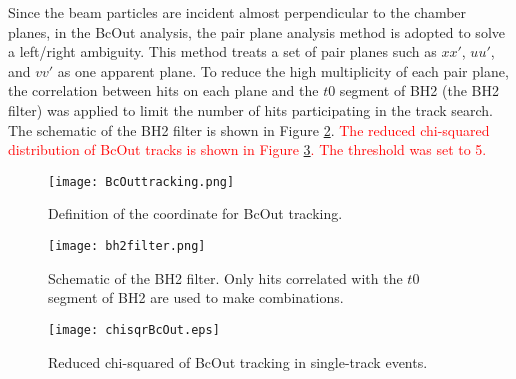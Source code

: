 Since the beam particles are incident almost perpendicular to the chamber planes, in the BcOut analysis, the pair plane analysis method is adopted to solve a left/right ambiguity. This method treats a set of pair planes such as $xx'$, $uu'$, and $vv'$ as one apparent plane. To reduce the high multiplicity of each pair plane, the correlation between hits on each plane and the $t0$ segment of BH2 (the BH2 filter) was applied to limit the number of hits participating in the track search. The schematic of the BH2 filter is shown in Figure \ref{fig-bh2filter}. \textcolor{red}{The reduced chi-squared distribution of BcOut tracks is shown in Figure \ref{fig-chisqrBcOut}. The threshold was set to 5.}

\begin{figure}[!h]
  \begin{center}
    \texttt{[image: BcOuttracking.png]}
    \caption{Definition of the coordinate for BcOut tracking.}
    \label{fig-BcOuttracking}
  \end{center}
\end{figure}

\begin{figure}[!h]
  \begin{center}
    \texttt{[image: bh2filter.png]}
    \caption{Schematic of the BH2 filter. Only hits correlated with the $t0$ segment of BH2 are used to make combinations.}
    \label{fig-bh2filter}
  \end{center}
\end{figure}

\begin{figure}[!h]
  \begin{center}
    \texttt{[image: chisqrBcOut.eps]}
    \caption{Reduced chi-squared of BcOut tracking in single-track events.}
    \label{fig-chisqrBcOut}
  \end{center}
\end{figure}

